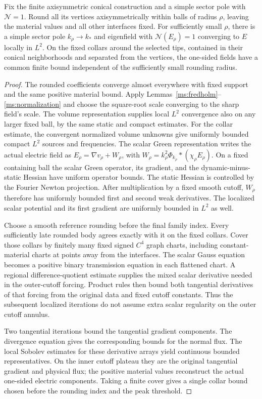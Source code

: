 \begin{lemma}
\label{ms:rounding}
Fix the finite axisymmetric conical construction and a simple
sector pole with $\mathcal N=1$.  Round all its vertices
axisymmetrically within balls of radius $\rho$, leaving the material
values and all other interfaces fixed.  For sufficiently small
$\rho$, there is a simple sector pole $k_\rho\to k_*$ and
eigenfield with $\mathcal N(E_\rho)=1$ converging to $E$ locally
in $L^2$.  On the fixed collars around the selected tips, contained
in their conical neighborhoods and separated from the vertices,
the one-sided fields have a common finite bound independent of
the sufficiently small rounding radius.
\end{lemma}

\begin{proof}
The rounded coefficients converge almost everywhere with fixed
support and the same positive material bound.  Apply
Lemmas~\ref{ms:fredholm}--\ref{ms:normalization} and choose the
square-root scale converging to the sharp field's scale.
The volume representation supplies local $L^2$ convergence also
on any larger fixed ball, by the same static and compact estimates.
For the collar estimate, the convergent normalized volume unknowns
give uniformly bounded compact $L^2$ sources and frequencies.
The scalar Green representation writes the actual electric field as
$E_\rho=\nabla v_\rho+W_\rho$, with
$W_\rho=k_\rho^2\Phi_{k_\rho}*(\chi_\rho E_\rho)$.
On a fixed containing ball the scalar Green operator, its gradient,
and the dynamic-minus-static Hessian have uniform operator bounds.
The static Hessian is controlled by the Fourier Newton projection.
After multiplication by a fixed smooth cutoff, $W_\rho$ therefore
has uniformly bounded first and second weak derivatives.  The
localized scalar potential and its first gradient are uniformly
bounded in $L^2$ as well.

Choose a smooth reference rounding before the final family index.
Every sufficiently late rounded body agrees exactly with it on the
fixed collars.  Cover those collars by finitely many fixed signed
$C^4$ graph charts, including constant-material charts at points
away from the interfaces.  The scalar Gauss equation becomes a
positive binary transmission equation in each flattened chart.
A regional difference-quotient estimate supplies the mixed scalar
derivative needed in the outer-cutoff forcing.  Product rules then
bound both tangential derivatives of that forcing from the original
data and fixed cutoff constants.  Thus the subsequent localized
iterations do not assume extra scalar regularity on the outer
cutoff annulus.

Two tangential iterations bound the tangential gradient components.
The divergence equation gives the corresponding bounds for the
normal flux.  The local Sobolev estimates for these derivative
arrays yield continuous bounded representatives.  On the inner
cutoff plateau they are the original tangential gradient and
physical flux; the positive material values reconstruct the actual
one-sided electric components.  Taking a finite cover gives a
single collar bound chosen before the rounding index and the peak
threshold.
\end{proof}

